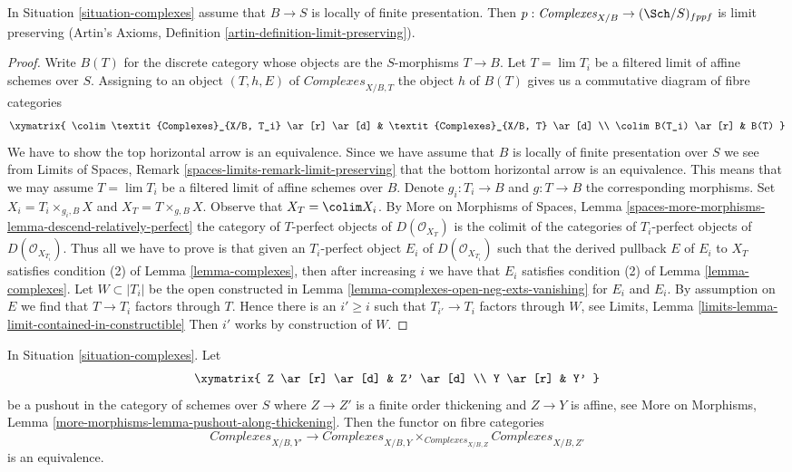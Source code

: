 \begin{lemma}
\label{lemma-complexes-limits}
In Situation \ref{situation-complexes} assume that $B \to S$
is locally of finite presentation. Then
$p : \textit{Complexes}_{X/B} \to (\Sch/S)_{fppf}$ is limit preserving
(Artin's Axioms, Definition \ref{artin-definition-limit-preserving}).
\end{lemma}

\begin{proof}
Write $B(T)$ for the discrete category whose
objects are the $S$-morphisms $T \to B$. Let $T = \lim T_i$ be a filtered
limit of affine schemes over $S$. Assigning to an object
$(T, h, E)$ of $\textit{Complexes}_{X/B, T}$ the object $h$
of $B(T)$ gives us a commutative diagram of fibre categories
$$
\xymatrix{
\colim \textit{Complexes}_{X/B, T_i} \ar[r] \ar[d] &
\textit{Complexes}_{X/B, T} \ar[d] \\
\colim B(T_i) \ar[r] & B(T)
}
$$
We have to show the top horizontal arrow is an equivalence. Since
we have assume that $B$ is locally of finite presentation over $S$
we see from
Limits of Spaces, Remark \ref{spaces-limits-remark-limit-preserving}
that the bottom horizontal arrow is an equivalence. This means that
we may assume $T = \lim T_i$ be a filtered limit of affine schemes over
$B$. Denote $g_i : T_i \to B$ and $g : T \to B$ the corresponding
morphisms. Set $X_i = T_i \times_{g_i, B} X$ and $X_T = T \times_{g, B} X$.
Observe that $X_T = \colim X_i$.
By More on Morphisms of Spaces, Lemma
\ref{spaces-more-morphisms-lemma-descend-relatively-perfect}
the category of $T$-perfect objects of $D(\mathcal{O}_{X_T})$
is the colimit of the categories of $T_i$-perfect objects
of $D(\mathcal{O}_{X_{T_i}})$.
Thus all we have to prove is that given an $T_i$-perfect object
$E_i$ of $D(\mathcal{O}_{X_{T_i}})$ such that
the derived pullback $E$ of $E_i$ to $X_T$ satisfies
condition (2) of Lemma \ref{lemma-complexes},
then after increasing $i$ we have that
$E_i$ satisfies
condition (2) of Lemma \ref{lemma-complexes}.
Let $W \subset |T_i|$ be the open constructed
in Lemma \ref{lemma-complexes-open-neg-exts-vanishing}
for $E_i$ and $E_i$. By assumption on $E$ we find
that $T \to T_i$ factors through $T$.
Hence there is an $i' \geq i$
such that $T_{i'} \to T_i$ factors through $W$, see
Limits, Lemma \ref{limits-lemma-limit-contained-in-constructible}
Then $i'$ works by construction of $W$.
\end{proof}

\begin{lemma}
\label{lemma-complexes-RS-star}
In Situation \ref{situation-complexes}. Let
$$
\xymatrix{
Z \ar[r] \ar[d] & Z' \ar[d] \\
Y \ar[r] & Y'
}
$$
be a pushout in the category of schemes over $S$ where
$Z \to Z'$ is a finite order thickening and $Z \to Y$ is affine, see
More on Morphisms, Lemma \ref{more-morphisms-lemma-pushout-along-thickening}.
Then the functor on fibre categories
$$
\textit{Complexes}_{X/B, Y'}
\longrightarrow
\textit{Complexes}_{X/B, Y}
\times_{\textit{Complexes}_{X/B, Z}}
\textit{Complexes}_{X/B, Z'}
$$
is an equivalence.
\end{lemma}

